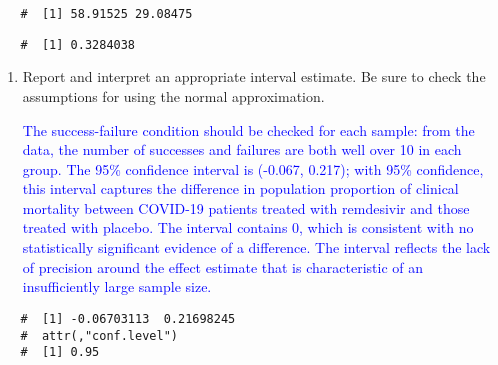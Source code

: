 \documentclass[letterpaper,12pt,twoside,]{pinp}
\begin{document}
\begin{enumerate}
\begin{Shaded}
\begin{Highlighting}[]
\OperatorTok{*}\NormalTok{(} \OperatorTok{-}\StringTok{ }
\end{Highlighting}
\end{Shaded}

  \begin{ShadedResult}
   \begin{verbatim}
   #  [1] 58.91525 29.08475
   \end{verbatim}
   \end{ShadedResult}

\begin{Shaded}
\begin{Highlighting}[]
\NormalTok{(}\OperatorTok{$}
\end{Highlighting}
\end{Shaded}

  \begin{ShadedResult}
   \begin{verbatim}
   #  [1] 0.3284038
   \end{verbatim}
   \end{ShadedResult}

  \begin{enumerate}
  \def\labelenumii{\alph{enumii})}
  \setcounter{enumii}{2}
  \item
    Report and interpret an appropriate interval estimate. Be sure to
    check the assumptions for using the normal approximation.

    \textcolor{blue}{The success-failure condition should be checked for each sample: from the data, the number of successes and failures are both well over 10 in each group. The 95\% confidence interval is (-0.067, 0.217); with 95\% confidence, this interval captures the difference in population proportion of clinical mortality between COVID-19 patients treated with remdesivir and those treated with placebo. The interval contains 0, which is consistent with no statistically significant evidence of a difference. The interval reflects the lack of precision around the effect estimate that is characteristic of an insufficiently large sample size.}
  \end{enumerate}

\begin{Shaded}
\begin{Highlighting}[]
\NormalTok{(}\OperatorTok{$}
\end{Highlighting}
\end{Shaded}

  \begin{ShadedResult}
   \begin{verbatim}
   #  [1] -0.06703113  0.21698245
   #  attr(,"conf.level")
   #  [1] 0.95
   \end{verbatim}
   \end{ShadedResult}
\end{enumerate}
\end{document}
